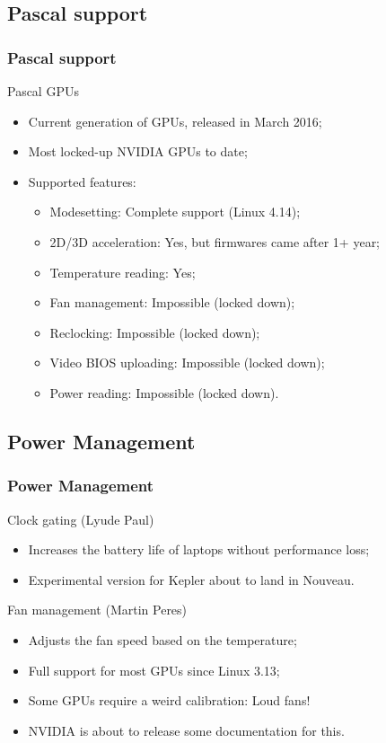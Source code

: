 \documentclass[11pt,english,compress]{beamer}
\begin{document}
\subsection*{Pascal support}
\begin{frame}
	\frametitle{Pascal support}

	\begin{block}{Pascal GPUs}
		\begin{itemize}
			\item Current generation of GPUs, released in March 2016;
			\item Most locked-up NVIDIA GPUs to date;
			\pause
			\item Supported features:
			\begin{itemize}
				\item Modesetting: Complete support (Linux 4.14);
				\item 2D/3D acceleration: Yes, but firmwares came after 1+ year;
				\item Temperature reading: Yes;
				\pause
				\item Fan management: Impossible (locked down);
				\item Reclocking: Impossible (locked down);
				\item Video BIOS uploading: Impossible (locked down);
				\item Power reading: Impossible (locked down).
			\end{itemize}
		\end{itemize}
	\end{block}
\end{frame}

\subsection{Power Management}

\begin{frame}
	\frametitle{Power Management}

	\begin{block}{Clock gating (Lyude Paul)}
		\begin{itemize}
			\item Increases the battery life of laptops without performance loss;
			\item Experimental version for Kepler about to land in Nouveau.
		\end{itemize}
	\end{block}

	\begin{block}{Fan management (Martin Peres)}
		\begin{itemize}
			\item Adjusts the fan speed based on the temperature;
			\item Full support for most GPUs since Linux 3.13;
			\item Some GPUs require a weird calibration: Loud fans!
			\item NVIDIA is about to release some documentation for this.
		\end{itemize}
	\end{block}
\end{frame}
\end{document}
